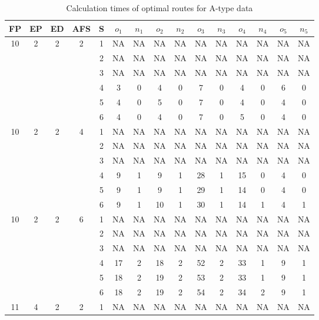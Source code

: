 \begin{longtable}{|c|c|c|c|c|c c|c c|c c|c c|c c|}
\caption{Calculation times of optimal routes for A-type data}
\label{tab:time_a} \\
\hline
FP  & EP & ED & AFS & S & $o_1$ & $n_1$ & $o_2$ & $n_2$ & $o_3$ & $n_3$ & $o_4$ & $n_4$ & $o_5$ & $n_5$\\
\hline\hline\multirow{6}{*}{10} & \multirow{6}{*}{2} & \multirow{6}{*}{2} & \multirow{6}{*}{2} & 1 & NA & NA & NA & NA & NA & NA & NA & NA & NA & NA \\
 & & & & 2 & NA & NA & NA & NA & NA & NA & NA & NA & NA & NA \\
 & & & & 3 & NA & NA & NA & NA & NA & NA & NA & NA & NA & NA \\
 & & & & 4 & 3 & 0 & 4 & 0 & 7 & 0 & 4 & 0 & 6 & 0 \\
 & & & & 5 & 4 & 0 & 5 & 0 & 7 & 0 & 4 & 0 & 4 & 0 \\
 & & & & 6 & 4 & 0 & 4 & 0 & 7 & 0 & 5 & 0 & 4 & 0 \\
\hline
\multirow{6}{*}{10} & \multirow{6}{*}{2} & \multirow{6}{*}{2} & \multirow{6}{*}{4} & 1 & NA & NA & NA & NA & NA & NA & NA & NA & NA & NA \\
 & & & & 2 & NA & NA & NA & NA & NA & NA & NA & NA & NA & NA \\
 & & & & 3 & NA & NA & NA & NA & NA & NA & NA & NA & NA & NA \\
 & & & & 4 & 9 & 1 & 9 & 1 & 28 & 1 & 15 & 0 & 4 & 0 \\
 & & & & 5 & 9 & 1 & 9 & 1 & 29 & 1 & 14 & 0 & 4 & 0 \\
 & & & & 6 & 9 & 1 & 10 & 1 & 30 & 1 & 14 & 1 & 4 & 1 \\
\hline
\multirow{6}{*}{10} & \multirow{6}{*}{2} & \multirow{6}{*}{2} & \multirow{6}{*}{6} & 1 & NA & NA & NA & NA & NA & NA & NA & NA & NA & NA \\
 & & & & 2 & NA & NA & NA & NA & NA & NA & NA & NA & NA & NA \\
 & & & & 3 & NA & NA & NA & NA & NA & NA & NA & NA & NA & NA \\
 & & & & 4 & 17 & 2 & 18 & 2 & 52 & 2 & 33 & 1 & 9 & 1 \\
 & & & & 5 & 18 & 2 & 19 & 2 & 53 & 2 & 33 & 1 & 9 & 1 \\
 & & & & 6 & 18 & 2 & 19 & 2 & 54 & 2 & 34 & 2 & 9 & 1 \\
\hline
\multirow{6}{*}{11} & \multirow{6}{*}{4} & \multirow{6}{*}{2} & \multirow{6}{*}{2} & 1 & NA & NA & NA & NA & NA & NA & NA & NA & NA & NA \\

\end{longtable}
